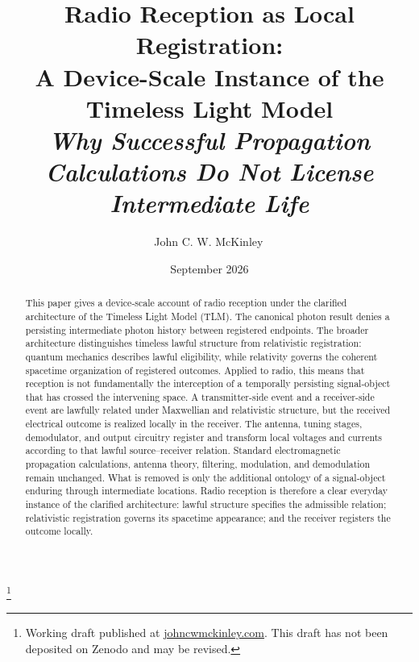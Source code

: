 \documentclass[12pt,onecolumn]{article}
\title{\textbf{Radio Reception as Local Registration:\\
A Device-Scale Instance of the Timeless Light Model}\\[0.4em]
\large\textit{Why Successful Propagation Calculations Do Not License Intermediate Life}}
\author{John C. W. McKinley\,\orcidlink{0009-0005-7097-5035}}
\date{September 2026}
\newcommand\blfootnote[1]{%
  \begingroup
  \renewcommand\thefootnote{}\footnote{#1}%
  \addtocounter{footnote}{-1}%
  \endgroup
}
\begin{document}
\maketitle

\blfootnote{\scriptsize
Working draft published at
\href{https://johncwmckinley.com}{johncwmckinley.com}.
This draft has not been deposited on Zenodo and may be revised.
}


\begin{abstract}

This paper gives a device-scale account of radio reception under the clarified architecture of the Timeless Light Model (TLM). The canonical photon result denies a persisting intermediate photon history between registered endpoints. The broader architecture distinguishes timeless lawful structure from relativistic registration: quantum mechanics describes lawful eligibility, while relativity governs the coherent spacetime organization of registered outcomes. Applied to radio, this means that reception is not fundamentally the interception of a temporally persisting signal-object that has crossed the intervening space. A transmitter-side event and a receiver-side event are lawfully related under Maxwellian and relativistic structure, but the received electrical outcome is realized locally in the receiver. The antenna, tuning stages, demodulator, and output circuitry register and transform local voltages and currents according to that lawful source--receiver relation. Standard electromagnetic propagation calculations, antenna theory, filtering, modulation, and demodulation remain unchanged. What is removed is only the additional ontology of a signal-object enduring through intermediate locations. Radio reception is therefore a clear everyday instance of the clarified architecture: lawful structure specifies the admissible relation; relativistic registration governs its spacetime appearance; and the receiver registers the outcome locally.

\end{abstract}


\vspace{0.8em}
\end{document}
